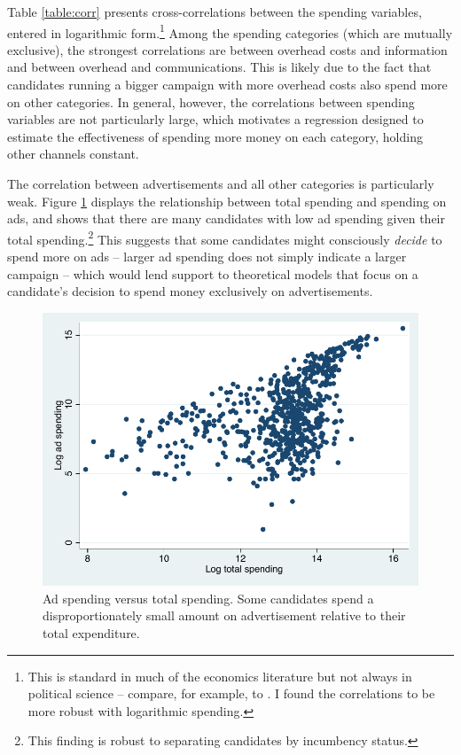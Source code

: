 \documentclass{article}
\begin{document}
Table \ref{table:corr} presents cross-correlations between the spending variables, entered in logarithmic form.\footnote{This is standard in much of the economics literature but not always in political science -- compare, for example, \cite{ansolabehere1994mismeasure} to \cite{jacobson-1978}. I found the correlations to be more robust with logarithmic spending.} Among the spending categories (which are mutually exclusive), the strongest correlations are between overhead costs and information and between overhead and communications. This is likely due to the fact that candidates running a bigger campaign with more overhead costs also spend more on other categories. In general, however, the correlations between spending variables are not particularly large, which motivates a regression designed to estimate the effectiveness of spending more money on each category, holding other channels constant.

The correlation between advertisements and all other categories is particularly weak. Figure \ref{fig:ads} displays the relationship between total spending and spending on ads, and shows that there are many candidates with low ad spending given their total spending.\footnote{This finding is robust to separating candidates by incumbency status.} This suggests that some candidates might consciously \textit{decide} to spend more on ads -- larger ad spending does not simply indicate a larger campaign -- which would lend support to theoretical models that focus on a candidate's decision to spend money exclusively on advertisements.

\begin{figure}
  \centering
  \caption{Ad spending versus total spending. Some candidates spend a disproportionately small amount on advertisement relative to their total expenditure.}
  \label{fig:ads}
  \includegraphics[width=.8\linewidth]{../charts/ads.pdf}
\end{figure}
\end{document}
